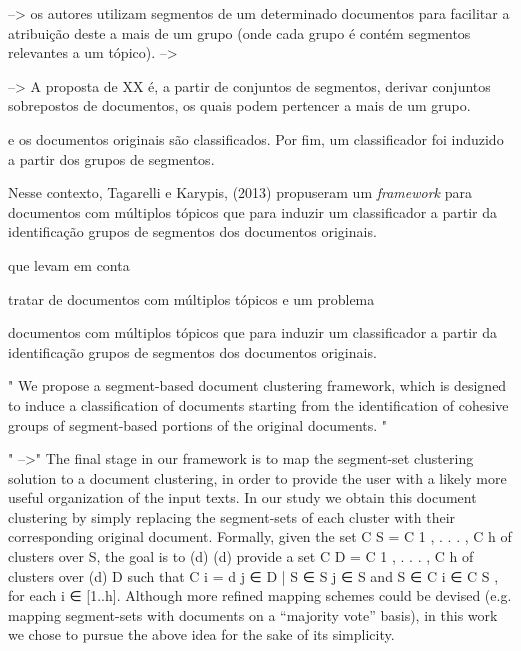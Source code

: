 --> os autores utilizam segmentos de um determinado documentos para facilitar a atribuição deste a mais de um grupo (onde cada grupo é contém segmentos relevantes a um tópico).
--> 

--> A proposta de XX é, a partir de conjuntos de segmentos, derivar conjuntos sobrepostos de documentos, os quais podem pertencer a mais de um grupo.




e os documentos originais são classificados. Por fim, um classificador foi induzido a partir dos grupos de segmentos.



Nesse contexto, Tagarelli e Karypis, (2013) propuseram um \textit{framework} para documentos com múltiplos tópicos que para induzir um classificador a partir da identificação grupos de segmentos dos documentos originais.


que levam em conta 




tratar de documentos com múltiplos tópicos e um problema 

documentos com múltiplos tópicos que para induzir um classificador a partir da identificação grupos de segmentos dos documentos originais.



\cite{Tagarelli2013} 
" We propose a segment-based document clustering framework, which is designed to induce a classification of documents starting from the identification of cohesive groups of segment-based portions of the original documents. "


" -->"
The final stage in our framework is to map the segment-set clustering solution to a document clustering, in order to provide the user with a likely more useful organization of the input texts. In our study we obtain this document clustering by simply replacing the segment-sets of each cluster with their corresponding original document. Formally, given the set C S = {C 1 , . . . , C h } of clusters over S, the goal is to (d) (d) provide a set C D = {C 1 , . . . , C h } of clusters over (d) D such that C i = {d j ∈ D | S ∈ S j ∈ S and S ∈ C i ∈ C S }, for each i ∈ [1..h].  Although more refined mapping schemes could be devised (e.g. mapping segment-sets with documents on a “majority vote” basis), in this work we chose to pursue the above idea for the sake of its simplicity.



